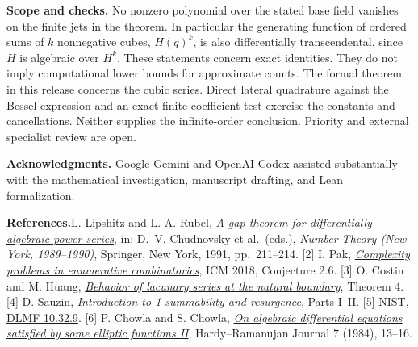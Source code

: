 \documentclass[11pt]{article}
\newcommand{\head}[1]{\par\medskip\noindent\textbf{#1}\quad}
\begin{document}
\head{Scope and checks.}
No nonzero polynomial over the stated base field vanishes on the finite jets in the theorem. In particular the generating function of ordered sums of $k$ nonnegative cubes, $H(q)^k$, is also differentially transcendental, since $H$ is algebraic over $H^k$. These statements concern exact identities. They do not imply computational lower bounds for approximate counts. The formal theorem in this release concerns the cubic series. Direct lateral quadrature against the Bessel expression and an exact finite-coefficient test exercise the constants and cancellations. Neither supplies the infinite-order conclusion. Priority and external specialist review are open.

\small
\head{Acknowledgments.}
Google Gemini and OpenAI Codex assisted substantially with the mathematical investigation, manuscript drafting, and Lean formalization.

\head{References.}
[1] L. Lipshitz and L. A. Rubel, \href{https://doi.org/10.1007/978-1-4757-4158-2_10}{\emph{A gap theorem for differentially algebraic power series}}, in: D.~V. Chudnovsky et al.\ (eds.), \emph{Number Theory (New York, 1989--1990)}, Springer, New York, 1991, pp.~211--214.
[2] I. Pak, \href{https://www.math.ucla.edu/~pak/papers/ICM-paper9.pdf}{\emph{Complexity problems in enumerative combinatorics}}, ICM 2018, Conjecture 2.6.
[3] O. Costin and M. Huang, \href{https://arxiv.org/abs/0810.3027}{\emph{Behavior of lacunary series at the natural boundary}}, Theorem 4.
[4] D. Sauzin, \href{https://arxiv.org/abs/1405.0356}{\emph{Introduction to 1-summability and resurgence}}, Parts I--II.
[5] NIST, \href{https://dlmf.nist.gov/10.32.E9}{DLMF 10.32.9}.
[6] P. Chowla and S. Chowla, \href{https://doi.org/10.46298/hrj.1984.107}{\emph{On algebraic differential equations satisfied by some elliptic functions II}}, Hardy--Ramanujan Journal 7 (1984), 13--16.
\end{document}

